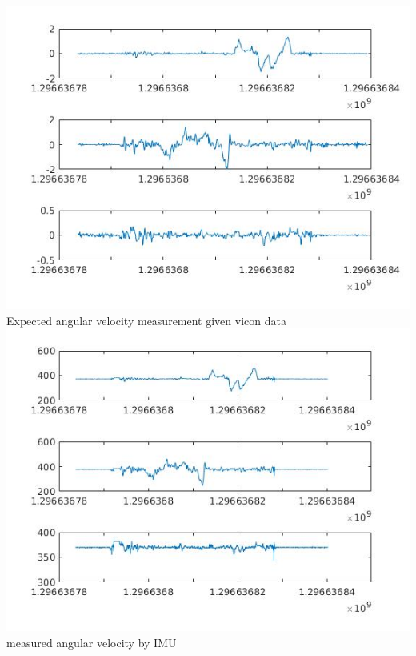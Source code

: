 \documentclass[english]{article}
\begin{document}
\includegraphics[scale=0.7]{vicon_omega.jpg}\\
Expected angular velocity measurement given vicon data\\



\includegraphics[scale=0.7]{imu_omega.jpg}\\
measured angular velocity by IMU\\
\end{document}
